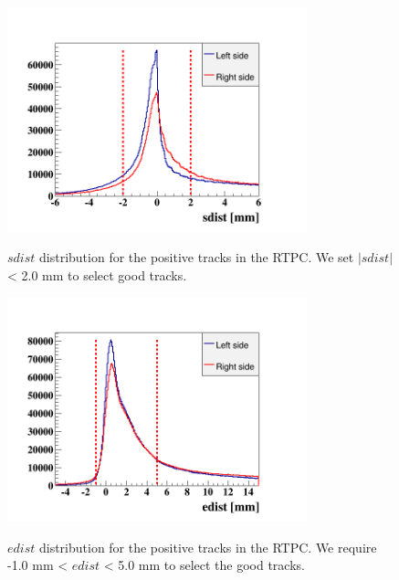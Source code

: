 \begin{itemize}
\begin{figure}[tbp]
\begin{minipage}[c]{.46\linewidth}
\hspace{-0.3in}
\includegraphics[height=6.5cm]{fig_rtpc/rtpc_sdist.png}
\caption{$sdist$ distribution for the positive tracks in the RTPC. We set $|sdist|$ < 2.0 mm to select good tracks.} 
\vspace{0.3in}
\label{fig:rrtpc_sdist}
\end{minipage} \hfill
\begin{minipage}[c]{.46\linewidth}
\hspace{-0.3in}
\includegraphics[height=6.5cm]{fig_rtpc/rtpc_edist.png}
\caption{$edist$ distribution for the positive tracks in the RTPC. We require -1.0 mm < $edist$ < 5.0 mm to select the good tracks.}
\vspace{+0.2in}
\label{fig:rrtpc_edist}
\end{minipage}
\end{figure}



\end{itemize}
